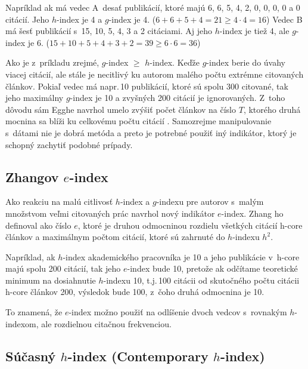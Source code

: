 Napríklad ak má vedec A~desať publikácií, ktoré majú 6, 6, 5, 4, 2, 0, 0, 0, 0 a
0 citácií.  Jeho $h$-index je 4 a $g$-index je 4.
($6+6+5+4 = 21 \geq 4\cdot4=16$) Vedec B má šesť publikácií s~15, 10, 5, 4, 3 a
2 citáciami.  Aj jeho $h$-index je tiež 4, ale $g$-index je 6.
($15+10+5+4+3+2 = 39 \geq 6\cdot6 = 36$)

Ako je z~príkladu zrejmé, $g$-index $\geq$ $h$-index.  Keďže $g$-index berie do
úvahy viacej citácií, ale stále je necitlivý ku autorom malého počtu extrémne
citovaných článkov.  Pokiaľ vedec má napr.\,10 publikácií, ktoré sú spolu 300
citované, tak jeho maximálny $g$-index je 10 a zvyšných 200 citácií je
ignorovaných.  Z~toho dôvodu sám Egghe navrhol umelo zvýšiť počet článkov na
číslo $T$, ktorého druhá mocnina sa blíži ku celkovému počtu citácií
\citep{Egghe2006}.  Samozrejme manipulovanie s~dátami nie je dobrá metóda a
preto je potrebné použiť iný indikátor, ktorý je schopný zachytiť podobné
prípady.


\subsection{Zhangov $e$-index}
\label{sec:e-index}

Ako reakciu na malú citlivosť $h$-index a $g$-indexu pre autorov s~malým
množstvom veľmi citovaných prác \citet{Zhang2009} navrhol nový indikátor
$e$-index.  Zhang ho definoval ako číslo $e$, ktoré je druhou odmocninou
rozdielu všetkých citácií h-core článkov a maximálnym počtom citácií, ktoré sú
zahrnuté do $h$-indexu $h^2$.

Napríklad, ak $h$-index akademického pracovníka je 10 a jeho publikácie v~h-core
majú spolu 200 citácií, tak jeho $e$-index bude 10, pretože ak odčítame
teoretické minimum na dosiahnutie $h$-indexu 10, t.j.\,100 citácii od skutočného
počtu citácii h-core článkov 200, výsledok bude 100, z~čoho druhá odmocnina je
10.

To znamená, že $e$-index možno použiť na odlíšenie dvoch vedcov s~rovnakým
$h$-indexom, ale rozdielnou citačnou frekvenciou.


\subsection{Súčasný $h$-index (Contemporary $h$-index)}
\label{sec:hc-index}

